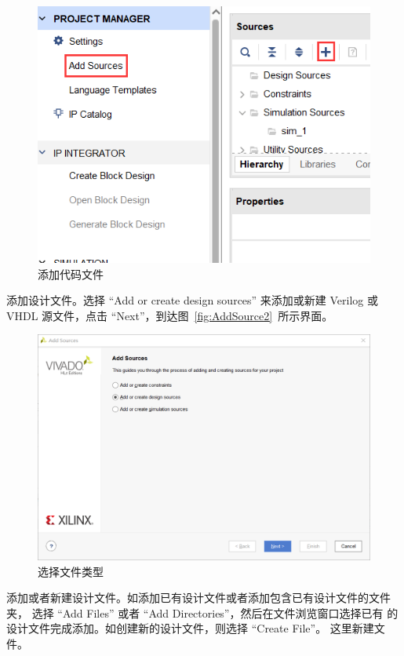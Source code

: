 \documentclass[ichigo,normal,cn]{elegantnote_mod}
\begin{document}
\begin{figure}[!htbp]
    \centering
    \includegraphics[width=.8\textwidth]{fig/AddSource}
    \caption{添加代码文件}
    \label{fig:AddSource}
\end{figure}

添加设计文件。选择 “Add or create design sources” 来添加或新建
 Verilog 或 VHDL 源文件，点击 “Next”，到达图~\ref{fig:AddSource2}~所示界面。
 
 \begin{figure}[!htbp]
    \centering
    \includegraphics[width=.8\textwidth]{fig/AddSource1}
    \caption{选择文件类型}
    \label{fig:AddSource1}
\end{figure}

添加或者新建设计文件。如添加已有设计文件或者添加包含已有设计文件的文件夹，
选择 “Add Files” 或者 “Add Directories”，然后在文件浏览窗口选择已有
的设计文件完成添加。如创建新的设计文件，则选择 “Create File”。
这里新建文件。
\end{document}
